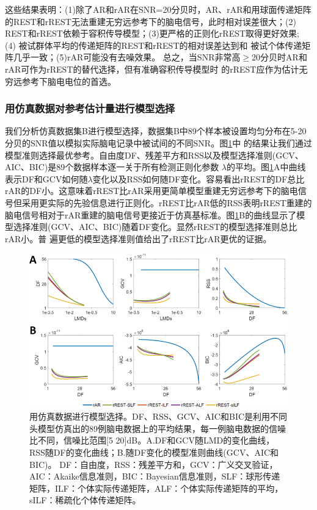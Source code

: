这些结果表明：(1)除了AR和rAR在SNR=20分贝时，AR、rAR和用球面传递矩阵的REST和rREST无法重建无穷远参考下的脑电信号，此时相对误差很大；(2) REST和rREST依赖于容积传导模型；(3)更严格的正则化rREST取得更好效果; (4) 被试群体平均的传递矩阵的REST和rREST的相对误差达到和
被试个体传递矩阵几乎一致；(5)rAR可能没有去噪效果。 总之，当SNR非常高$\geq$20分贝时AR和rAR可作为rREST的替代选择，但有准确容积传导模型时
的rREST应作为估计无穷远参考下脑电电位的首选。

\subsubsection{用仿真数据对参考估计量进行模型选择}
我们分析仿真数据集B进行模型选择，数据集B中89个样本被设置均匀分布在5-20分贝的SNR值以模拟实际脑电记录中被试间的不同SNR。图\ref{3:5}中
的结果让我们通过模型准则选择最优参考。自由度DF、残差平方和RSS以及模型选择准则(GCV、AIC、BIC)是89个数据样本逐一关于所有检测正则化参数
$\lambda$的平均。图\ref{3:5}A中曲线表示DF和GCV如何随$\lambda$变化以及RSS如何随DF变化。容易看出rREST的DF总比rAR的DF小。这意味着rREST比rAR采用更简单模型重建无穷远参考下的脑电信号但采用更实际的先验信息进行正则化。rREST比rAR低的RSS表明rREST重建的脑电信号相对于rAR重建的脑电信号更接近于仿真基标准。图\ref{3:5}B的曲线显示了模型选择准则(GCV、AIC、BIC)随着DF变化。显然rREST的模型选择准则总比rAR小。普
遍更低的模型选择准则值给出了rREST比rAR更优的证据。
\begin{figure}[!h]
	\centering
	\includegraphics[width=15cm]{pic/Frontier/figure5.png}
	\caption{用仿真数据进行模型选择。DF、RSS、GCV、AIC和BIC是利用不同头模型仿真出的89例脑电数据上的平均结果，每一例脑电数据的信噪比不同，信噪比范围[5 20]dB。A.DF和GCV随LMD的变化曲线，RSS随DF的变化曲线；B.随DF变化的模型准则曲线(GCV、AIC和BIC)。 DF：自由度，RSS：残差平方和，GCV：广义交叉验证，AIC：Akaike信息准则，BIC：Bayesian信息准则，SLF：球形传递矩阵，ILF：个体实际传递矩阵，ALF：个体实际传递矩阵的平均，sILF：稀疏化个体传递矩阵。}
	\label{3:5}
\end{figure}

